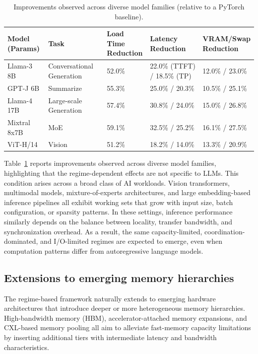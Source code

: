 \begin{table}[t] %
\centering
\caption{Improvements observed across diverse model families (relative to a PyTorch baseline).}
\label{tab:cross-model}
\renewcommand{\arraystretch}{1.3}
\footnotesize %

\begin{tabularx}{\textwidth}{|X|X|X|X|X|} %
\hline
\makecell[l]{\textbf{Model} \\ \textbf{(Params)}} & 
\textbf{Task} & 
\makecell[l]{\textbf{Load Time} \\ \textbf{Reduction}} & 
\makecell[l]{\textbf{Latency} \\ \textbf{Reduction}} & 
\makecell[l]{\textbf{VRAM/Swap} \\ \textbf{Reduction}} \\
\hline
Llama-3 8B & Conversational Generation & 52.0\% & 22.0\% (TTFT) / 18.5\% (TP) & 12.0\% / 23.0\% \\
\hline
GPT-J 6B & Summarize & 55.3\% & 25.0\% / 20.3\% & 10.5\% / 25.1\% \\
\hline
Llama-4 17B & Large-scale Generation & 57.4\% & 30.8\% / 24.0\% & 15.0\% / 26.8\% \\
\hline
Mixtral 8x7B & MoE & 59.1\% & 32.5\% / 25.2\% & 16.1\% / 27.5\% \\
\hline
ViT-H/14 & Vision & 51.2\% & 18.2\% / 14.0\% & 13.3\% / 20.9\% \\
\hline
\end{tabularx}
\end{table}

Table~\ref{tab:cross-model} reports improvements observed across diverse model families, highlighting that the regime-dependent effects are not specific to LLMs.
This condition arises across a broad class of AI workloads. Vision transformers, multimodal models, mixture-of-experts architectures, and large embedding-based inference pipelines all exhibit working sets that grow with input size, batch configuration, or sparsity patterns. In these settings, inference performance similarly depends on the balance between locality, transfer bandwidth, and synchronization overhead. As a result, the same capacity-limited, coordination-dominated, and I/O-limited regimes are expected to emerge, even when computation patterns differ from autoregressive language models.


\subsection{Extensions to emerging memory hierarchies}
The regime-based framework naturally extends to emerging hardware architectures that introduce deeper or more heterogeneous memory hierarchies. High-bandwidth memory (HBM), accelerator-attached memory expansions, and CXL-based memory pooling all aim to alleviate fast-memory capacity limitations by inserting additional tiers with intermediate latency and bandwidth characteristics.

